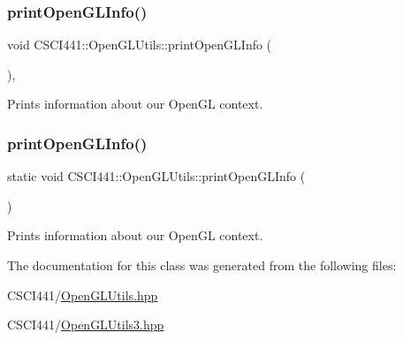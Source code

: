 \subsubsection{\texorpdfstring{print\+Open\+G\+L\+Info()}{printOpenGLInfo()}\hspace{0.1cm}{\footnotesize\ttfamily [1/2]}}
{\footnotesize\ttfamily void C\+S\+C\+I441\+::\+Open\+G\+L\+Utils\+::print\+Open\+G\+L\+Info (\begin{DoxyParamCaption}{ }\end{DoxyParamCaption})\hspace{0.3cm}{\ttfamily [inline]}, {\ttfamily [static]}}



Prints information about our Open\+GL context. 

\mbox{\label{class_c_s_c_i441_1_1_open_g_l_utils_a6573ac10358f66b5c8a3bd57023106ba}} 
\subsubsection{\texorpdfstring{print\+Open\+G\+L\+Info()}{printOpenGLInfo()}\hspace{0.1cm}{\footnotesize\ttfamily [2/2]}}
{\footnotesize\ttfamily static void C\+S\+C\+I441\+::\+Open\+G\+L\+Utils\+::print\+Open\+G\+L\+Info (\begin{DoxyParamCaption}{ }\end{DoxyParamCaption})\hspace{0.3cm}{\ttfamily [static]}}



Prints information about our Open\+GL context. 



The documentation for this class was generated from the following files\+:\begin{DoxyCompactItemize}
\item 
C\+S\+C\+I441/\hyperlink{_open_g_l_utils_8hpp}{Open\+G\+L\+Utils.\+hpp}\item 
C\+S\+C\+I441/\hyperlink{_open_g_l_utils3_8hpp}{Open\+G\+L\+Utils3.\+hpp}\end{DoxyCompactItemize}

